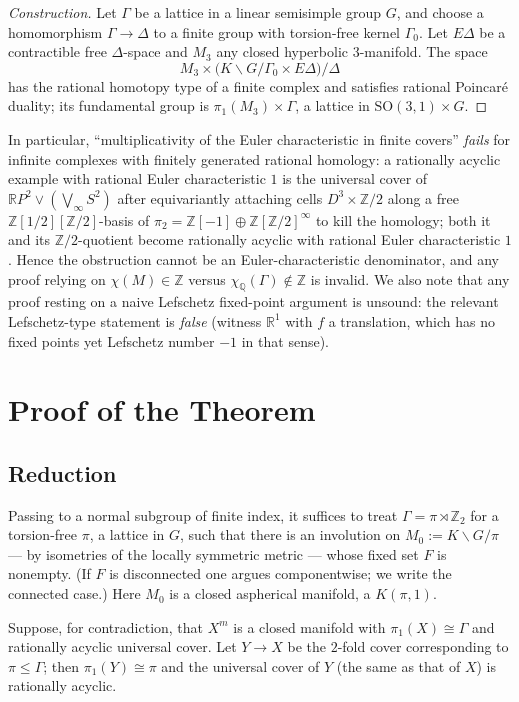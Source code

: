 \documentclass[11pt]{article}
\newcommand{\R}{\mathbb{R}}
\newcommand{\Q}{\mathbb{Q}}
\newcommand{\Z}{\mathbb{Z}}
\begin{document}
\begin{proof}[Construction]
Let $\Gamma$ be a lattice in a linear semisimple group $G$, and choose a
homomorphism $\Gamma\to\Delta$ to a finite group with torsion-free kernel
$\Gamma_0$. Let $E\Delta$ be a contractible free $\Delta$-space and $M_3$ any
closed hyperbolic $3$-manifold. The space
\[
  M_3\times\bigl(K\backslash G/\Gamma_0\times E\Delta\bigr)/\Delta
\]
has the rational homotopy type of a finite complex and satisfies rational
Poincar\'e duality; its fundamental group is $\pi_1(M_3)\times\Gamma$, a lattice
in $\mathrm{SO}(3,1)\times G$.
\end{proof}

In particular, ``multiplicativity of the Euler characteristic in finite covers''
\emph{fails} for infinite complexes with finitely generated rational homology: a
rationally acyclic example with rational Euler characteristic $1$ is the
universal cover of $\R P^2\vee(\bigvee_\infty S^2)$ after equivariantly attaching
cells $D^3\times\Z/2$ along a free $\Z[1/2][\Z/2]$-basis of
$\pi_2=\Z[-1]\oplus\Z[\Z/2]^{\infty}$ to kill the homology; both it and its
$\Z/2$-quotient become rationally acyclic with rational Euler characteristic $1$.
Hence the obstruction cannot be an Euler-characteristic denominator, and any
proof relying on $\chi(M)\in\Z$ versus $\chi_\Q(\Gamma)\notin\Z$ is invalid. We
also note that any proof resting on a naive Lefschetz fixed-point argument is
unsound: the relevant Lefschetz-type statement is \emph{false} (witness
$\R^1$ with $f$ a translation, which has no fixed points yet Lefschetz number
$-1$ in that sense).

\section*{Proof of the Theorem}

\subsection*{Reduction}

Passing to a normal subgroup of finite index, it suffices to treat
$\Gamma=\pi\rtimes\Z_2$ for a torsion-free $\pi$, a lattice in $G$, such that
there is an involution on $M_0:=K\backslash G/\pi$ --- by isometries of the
locally symmetric metric --- whose fixed set $F$ is nonempty. (If $F$ is
disconnected one argues componentwise; we write the connected case.) Here $M_0$
is a closed aspherical manifold, a $K(\pi,1)$.

Suppose, for contradiction, that $X^m$ is a closed manifold with
$\pi_1(X)\cong\Gamma$ and rationally acyclic universal cover. Let $Y\to X$ be the
$2$-fold cover corresponding to $\pi\le\Gamma$; then $\pi_1(Y)\cong\pi$ and the
universal cover of $Y$ (the same as that of $X$) is rationally acyclic.
\end{document}

